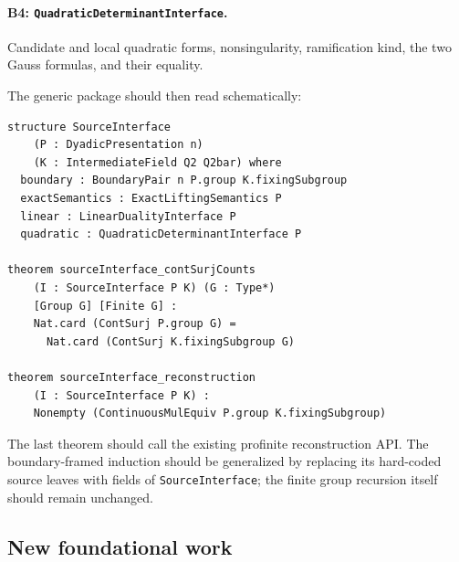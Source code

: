 \documentclass[11pt,reqno]{amsart}
\theoremstyle{definition}
\theoremstyle{remark}
\numberwithin{equation}{section}
\begin{document}
\paragraph{B4: \texttt{QuadraticDeterminantInterface}.}
Candidate and local quadratic forms, nonsingularity, ramification kind,
the two Gauss formulas, and their equality.

The generic package should then read schematically:
\begin{verbatim}
structure SourceInterface
    (P : DyadicPresentation n)
    (K : IntermediateField Q2 Q2bar) where
  boundary : BoundaryPair n P.group K.fixingSubgroup
  exactSemantics : ExactLiftingSemantics P
  linear : LinearDualityInterface P
  quadratic : QuadraticDeterminantInterface P

theorem sourceInterface_contSurjCounts
    (I : SourceInterface P K) (G : Type*)
    [Group G] [Finite G] :
    Nat.card (ContSurj P.group G) =
      Nat.card (ContSurj K.fixingSubgroup G)

theorem sourceInterface_reconstruction
    (I : SourceInterface P K) :
    Nonempty (ContinuousMulEquiv P.group K.fixingSubgroup)
\end{verbatim}
The last theorem should call the existing profinite reconstruction API.
The boundary-framed induction should be generalized by replacing its
hard-coded source leaves with fields of
\texttt{Source}\-\texttt{Interface}; the
finite group recursion itself should remain unchanged.

\subsection{New foundational work}
\end{document}
